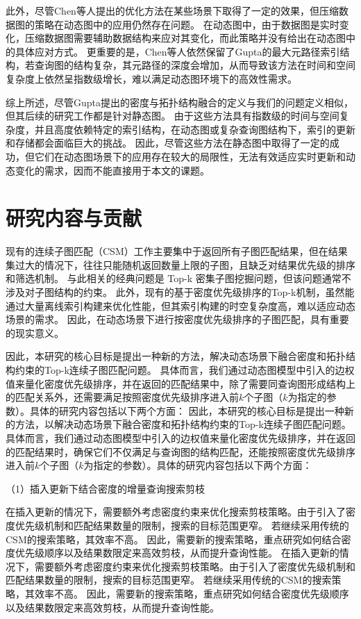 此外，尽管Chen等人提出的优化方法在某些场景下取得了一定的效果，但压缩数据图的策略在动态图中的应用仍然存在问题。
在动态图中，由于数据图是实时变化，压缩数据图需要辅助数据结构来应对其变化，而此策略并没有给出在动态图中的具体应对方式。
更重要的是，Chen等人依然保留了Gupta的最大元路径索引结构，若查询图的结构复杂，其元路径的深度会增加，从而导致该方法在时间和空间复杂度上依然呈指数级增长，难以满足动态图环境下的高效性需求。


综上所述，尽管Gupta提出的密度与拓扑结构融合的定义与我们的问题定义相似，但其后续的研究工作都是针对静态图。
由于这些方法具有指数级的时间与空间复杂度，并且高度依赖特定的索引结构，在动态图或复杂查询图结构下，索引的更新和存储都会面临巨大的挑战。
因此，尽管这些方法在静态图中取得了一定的成功，但它们在动态图场景下的应用存在较大的局限性，无法有效适应实时更新和动态变化的需求，因而不能直接用于本文的课题。
\section{研究内容与贡献}
现有的连续子图匹配（CSM）工作主要集中于返回所有子图匹配结果，但在结果集过大的情况下，往往只能随机返回数量上限的子图，且缺乏对结果优先级的排序和筛选机制。
与此相关的经典问题是 Top-k 密集子图挖掘问题，但该问题通常不涉及对子图结构的约束。
此外，现有的基于密度优先级排序的Top-k机制，虽然能通过大量离线索引构建来优化性能，但其索引构建的时空复杂度高，难以适应动态场景的需求。
因此，在动态场景下进行按密度优先级排序的子图匹配，具有重要的现实意义。


因此，本研究的核心目标是提出一种新的方法，解决动态场景下融合密度和拓扑结构约束的Top-k连续子图匹配问题。
具体而言，我们通过动态图模型中引入的边权值来量化密度优先级排序，并在返回的匹配结果中，除了需要同查询图形成结构上的匹配关系外，还需要满足按照密度优先级排序进入前$k$个子图（$k$为指定的参数）。具体的研究内容包括以下两个方面：
因此，本研究的核心目标是提出一种新的方法，以解决动态场景下融合密度和拓扑结构约束的Top-k连续子图匹配问题。
具体而言，我们通过动态图模型中引入的边权值来量化密度优先级排序，并在返回的匹配结果时，确保它们不仅满足与查询图的结构匹配，还能按照密度优先级排序进入前$k$个子图（$k$为指定的参数）。具体的研究内容包括以下两个方面：

（1）插入更新下结合密度的增量查询搜索剪枝

      在插入更新的情况下，需要额外考虑密度约束来优化搜索剪枝策略。由于引入了密度优先级机制和匹配结果数量的限制，搜索的目标范围更窄。
      若继续采用传统的CSM的搜索策略，其效率不高。
      因此，需要新的搜索策略，重点研究如何结合密度优先级顺序以及结果数限定来高效剪枝，从而提升查询性能。
      在插入更新的情况下，需要额外考虑密度约束来优化搜索剪枝策略。由于引入了密度优先级机制和匹配结果数量的限制，搜索的目标范围更窄。
      若继续采用传统的CSM的搜索策略，其效率不高。
      因此，需要新的搜索策略，重点研究如何结合密度优先级顺序以及结果数限定来高效剪枝，从而提升查询性能。

